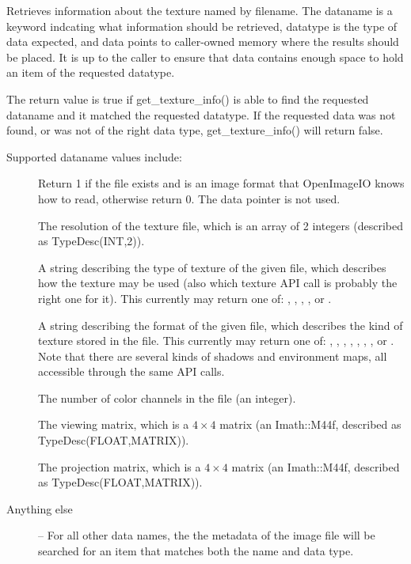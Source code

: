 Retrieves information about the texture named by {\cf filename}.
The {\cf dataname} is a keyword indcating what information should
be retrieved, {\cf datatype} is the type of data expected, and
{\cf data} points to caller-owned memory where the results should be
placed.  It is up to the caller to ensure that {\cf data} contains
enough space to hold an item of the requested {\cf datatype}.

The return value is {\cf true} if {\cf get_texture_info()} is able
to find the requested {\cf dataname} and it matched the requested
{\cf datatype}.  If the requested data was not found, or was not
of the right data type, {\cf get_texture_info()} will return {\cf false}.

Supported {\cf dataname} values include:

\begin{description}
\item[\spc] \spc \vspace{-12pt} 
\item[\rm {}] Return 1 if the file exists and
is an image format that OpenImageIO knows how to read, otherwise return
0.  The {\cf data} pointer is not used.

\item[\rm {}] The resolution of the texture file, which
is an array of 2 integers (described as {\cf TypeDesc(INT,2)}).

\item[\rm {}] A string describing the type of texture
of the given file, which describes how the texture may be used (also
which texture API call is probably the right one for it).
This currently may return one of: , ,
, , 
or .

\item[\rm {}] A string describing the format of the
given file, which describes the kind of texture stored in the file.
This currently may return one of: , ,
, , , , , or .
Note that there are several kinds of shadows and environment maps,
all accessible through the same API calls.

\item[\rm {}] The number of color channels in the file 
(an integer).

\item[\rm {}] The viewing matrix, which is a
$4 \times 4$ matrix (an {\cf Imath::M44f}, described as {\cf
  TypeDesc(FLOAT,MATRIX)}).

\item[\rm {}] The projection matrix, which is a
$4 \times 4$ matrix (an {\cf Imath::M44f}, described as {\cf
  TypeDesc(FLOAT,MATRIX)}).

\item[Anything else] -- For all other data names, the
the metadata of the image file will be searched for an item that
matches both the name and data type.

\end{description}
\apiend

